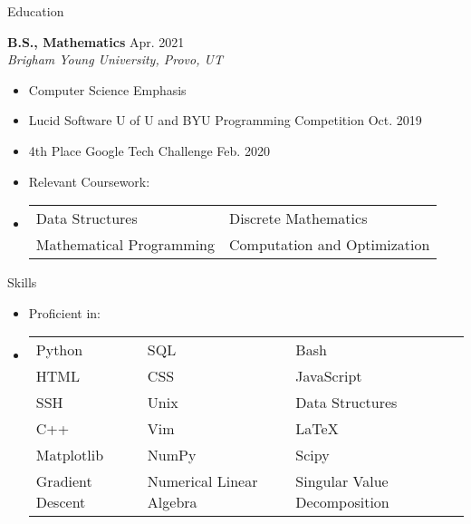 \documentclass{resume} %
\begin{document}
\begin{rSection}{Education}

    {\bf B.S., Mathematics }\hfill {Apr. 2021} \\
\textit{Brigham Young University, Provo, UT}
    \begin{itemize}
        \item Computer Science Emphasis
        \item Lucid Software U of U and BYU Programming Competition      \hfill {Oct. 2019}
        \item 4th Place Google Tech Challenge \hfill {Feb. 2020}
        \item Relevant Coursework:
        \item[]
            \begin{tabular}{l l}
                Data Structures & Discrete Mathematics   \\ 
                Mathematical Programming & Computation and Optimization 
            \end{tabular}
    \end{itemize}
\end{rSection}

\begin{rSection}{Skills}
    \begin{itemize}
        \item Proficient in:
        \item[]
        \begin{tabular}{ l l l }
	Python     & SQL    & Bash \\
 	HTML 	      & CSS    & JavaScript \\
            SSH         & Unix   & Data Structures  \\
            C++        & Vim    & \LaTeX  \\
            Matplotlib & NumPy & Scipy \\
            Gradient Descent & Numerical Linear Algebra  & Singular Value Decomposition
        \end{tabular}
    \end{itemize}
\end{rSection}
\end{document}
